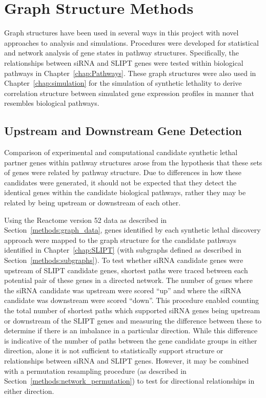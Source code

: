 \FloatBarrier

\section{Graph Structure Methods}
Graph structures have been used in several ways in this project with novel approaches to analysis and simulations. Procedures were developed for statistical and network analysis of gene states in pathway structures. Specifically, the relationships between \gls{siRNA} and \gls{SLIPT} genes were tested within biological pathways in Chapter~\ref{chap:Pathways}. These graph structures were also used in Chapter~\ref{chap:simulation} for the simulation of synthetic lethality to derive correlation structure between simulated gene expression profiles in manner that resembles biological pathways.


\subsection{Upstream and Downstream Gene Detection} \label{methods:pathway_str} 
Comparison of experimental and computational candidate synthetic lethal partner genes within pathway structures arose from the hypothesis that these sets of genes were related by pathway structure. Due to differences in how these candidates were generated, it should not be expected that they detect the identical genes within the candidate biological pathways, rather they may be related by being upstream or downstream of each other. 

Using the Reactome version 52 data \citep{Reactome} as described in Section~\ref{methods:graph_data}, genes identified by each synthetic lethal discovery approach were mapped to the graph structure for the candidate pathways identified in Chapter~\ref{chap:SLIPT} (with subgraphs defined as described in Section~\ref{methods:subgraphs}). To test whether \gls{siRNA} candidate genes were upstream of \gls{SLIPT} candidate genes, shortest paths were traced between each potential pair of these genes in a directed network. The number of genes where the \gls{siRNA} candidate was upstream were scored ``up'' and where the \gls{siRNA} candidate was downstream were scored ``down''.  This procedure enabled counting the total number of shortest paths which supported \gls{siRNA} genes being upstream or downstream of the \gls{SLIPT} genes and measuring the difference between these to determine if there is an imbalance in a particular direction. While this difference is indicative of the number of paths between the gene candidate groups in either direction, alone it is not sufficient to statistically support structure or relationships between \gls{siRNA} and \gls{SLIPT} genes. However, it may be combined with a permutation resampling procedure (as described in Section~\ref{methods:network_permutation}) to test for directional relationships in either direction.

